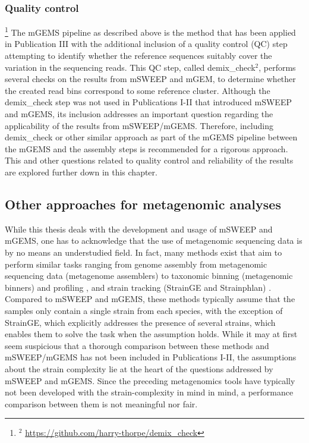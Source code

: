 \documentclass[officiallayout]{tktla}
\begin{document}
\subsubsection{Quality control}

\noindent\let\thefootnote\relax\footnote{$^{2}$ \url{https://github.com/harry-thorpe/demix_check}}
The mGEMS pipeline as described above is the method that has been
applied in Publication III with the additional inclusion of a quality
control (QC) step attempting to identify whether the reference
sequences suitably cover the variation in the sequencing reads. This
QC step, called demix\_check$^{2}$, performs several checks on the results from mSWEEP and
mGEM, to determine whether the created read bins correspond to some
reference cluster. Although the demix\_check step was not used in
Publications I-II that introduced mSWEEP and mGEMS, its inclusion
addresses an important question regarding the applicability of the
results from mSWEEP/mGEMS. Therefore, including demix\_check \textemdash{ } or other
similar approach \textemdash{ } as part of the mGEMS pipeline between
the mGEMS and the assembly steps is recommended for a rigorous
approach. This and other questions related to quality control and
reliability of the results are explored further down in this
chapter.

\subsection{Other approaches for metagenomic analyses}
\label{other-metagenomics-approaches}
While this thesis deals with the development and usage of mSWEEP and
mGEMS, one has to acknowledge that the use of metagenomic sequencing
data is by no means an understudied field. In fact, many methods exist
that aim to perform similar tasks ranging from genome assembly from
metagenomic sequencing data (metagenome assemblers)
\citep{peng2012idba, li2015megahit, nurk2017metaspades} to taxonomic
binning (metagenomic binners) \citep{kang2019metabat, wu2016maxbin,
  sieber2018recovery} and profiling \citep{beghini2021integrating,
  van2022strainge}, and strain tracking (StrainGE and Strainphlan)
\citep{truong2017microbial, van2022strainge}. Compared to mSWEEP and
mGEMS, these methods typically assume that the samples only contain a
single strain from each species, with the exception of StrainGE, which
explicitly addresses the presence of several strains, which enables
them to solve the task when the assumption holds. While it may at
first seem suspicious that a thorough comparison between these methods
and mSWEEP/mGEMS has not been included in Publications I-II, the
assumptions about the strain complexity lie at the heart of the
questions addressed by mSWEEP and mGEMS. Since the preceding
metagenomics tools have typically not been developed with the
strain-complexity in mind in mind, a performance comparison between
them is not meaningful nor fair.
\end{document}
